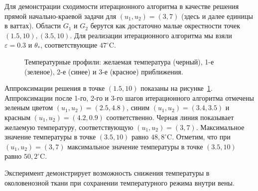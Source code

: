 Для демонстрации сходимости итерационного алгоритма в качестве
решения прямой начально-краевой задачи для $\left(u_{1}, u_{2}\right)=( 3,7)$
(здесь и далее единицы в ваттах).
Области $G_{1}$ и $G_{2}$ берутся как достаточно малые окрестности
точек $(1.5,10),(3.5,10)$.
Для реализации итерационного алгоритма мы взяли $\varepsilon=0.3$ и $\theta_{*}$,
соответствующие $47^{\circ} \mathrm{C}$.


\begin{figure}[h!t]
    \caption{Температурные профили: желаемая температура (черный),
        1-е (зеленое), 2-е (синее) и 3-е (красное) приближения.}
    \label{fig:4_3:7}
\end{figure}



Аппроксимации решения в точке $(1.5,10)$ показаны на рисунке~\ref{fig:4_3:7}.
Аппроксимации после 1-го, 2-го и 3-го шагов итерационного
алгоритма отмечены зеленым цветом
$\left(u_{1 }, u_{2}\right)=(2.5,4.8)$,
синим  $\left(u_{1}, u_{2}\right)=(3.4,3.5)$
и красным $\left(u_{1}, u_{2}\right)=(4.2,0.9)$ соответственно.
Черная линия показывает желаемую температуру, соответствующую
$\left(u_{1}, u_{2}\right)=(3,7)$.
Максимальное значение температуры в точке $(3.5,10)$ равно $48,8^{\circ}\mathrm{C}$.
Отметим, что при $\left(u_{1}, u_{2}\right)=(3,7)$ максимальное значение
температуры в точке $(3.5,10)$ равно $50,2^{ \circ} \mathrm{C}$.

Эксперимент демонстрирует возможность снижения температуры в
околовенозной ткани при сохранении температурного режима внутри вены.
